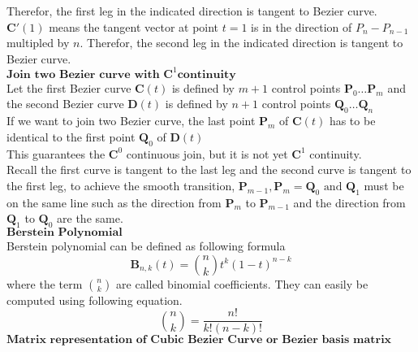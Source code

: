 \documentclass{article}
\begin{document}
Therefor, the first leg in the indicated direction is tangent to Bezier curve. \\
\newline
$\textbf{C}'(1)$ means the tangent vector at point $t=1$ is in the direction of $P_n - P_{n-1}$ multipled by $n$.
Therefor, the second leg in the indicated direction is tangent to Bezier curve. \\
\newline
$ \textbf{Join two Bezier curve with } \textbf{C}^{1} \textbf{continuity} $ \\
Let the first Bezier curve $\textbf{C}(t)$ is defined by $m+1$ control points $\textbf{P}_0 \dots \textbf{P}_m$ and the second Bezier curve $\textbf{D}(t)$ is defined by $n+1$ 
control points $\textbf{Q}_0 \dots \textbf{Q}_n$ \\
If we want to join two Bezier curve, the last point $\textbf{P}_m$ of $\textbf{C}(t)$ has to be identical to the first point $\textbf{Q}_0$ of $\textbf{D}(t)$ \\ 
\newline
This guarantees the $\textbf{C}^0$ continuous join, but it is not yet $\textbf{C}^1$ continuity. \\
Recall the first curve is tangent to the last leg and the second curve is tangent to the first leg, to achieve the smooth transition, $\textbf{P}_{m-1}, \textbf{P}_m=\textbf{Q}_0 \text{ and } \textbf{Q}_1$ must be on the same line such as the direction from $\textbf{P}_m$ to $\textbf{P}_{m-1}$ and the direction from $\textbf{Q}_1$ to $\textbf{Q}_0$ are the same.\\
\newline
$\textbf{Berstein Polynomial}$ \\ 
Berstein polynomial can be defined as following formula \\
\[ \textbf{B}_{n,k}(t) = \binom{n}{k}t^k (1-t)^{n-k}  \]
where the term $\binom{n}{k}$ are called binomial coefficients. They can easily be computed using following equation.\\
\[ \binom{n}{k} = \frac{n!}{k!(n-k)!} \]
\newline
$\textbf{Matrix representation of Cubic Bezier Curve or Bezier basis matrix}$ 
\end{document}

